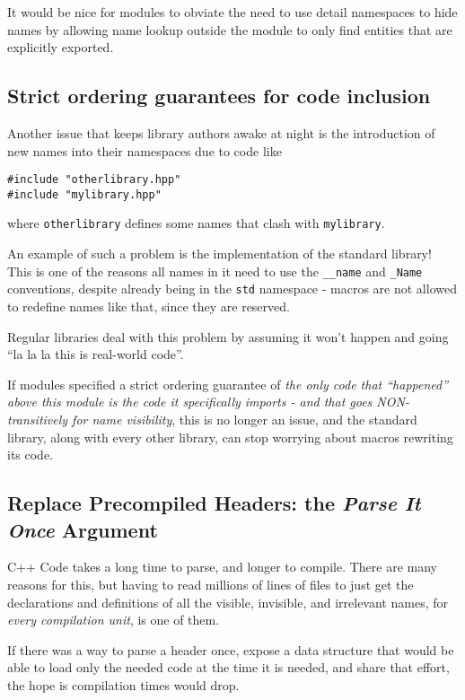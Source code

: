 \documentclass[reqno]{article}
\begin{document}
It would be nice for modules to obviate the need to use detail namespaces to
hide names by allowing name lookup outside the module to only find entities that
are explicitly exported.


\subsection{Strict ordering guarantees for code inclusion}

Another issue that keeps library authors awake at night is the introduction of
new names into their namespaces due to code like

\begin{verbatim}
#include "otherlibrary.hpp"
#include "mylibrary.hpp"
\end{verbatim}

where \texttt{otherlibrary} defines some names that clash with
\texttt{mylibrary}.

An example of such a problem is the implementation of the standard library! This
is one of the reasons all names in it need to use the \texttt{\_\_name} and
\texttt{\_Name} conventions, despite already being in the \texttt{std} namespace
- macros are not allowed to redefine names like that, since they are reserved.

Regular libraries deal with this problem by assuming it won't happen and going
“la la la this is real-world code”.

If modules specified a strict ordering guarantee of \emph{the only code that
“happened” above this module is the code it specifically imports - and that goes
NON-transitively for name visibility}, this is no longer an issue, and the
standard library, along with every other library, can stop worrying about macros
rewriting its code.


\subsection{Replace Precompiled Headers: the \emph{Parse It Once} Argument}

C++ Code takes a long time to parse, and longer to compile. There are many
reasons for this, but having to read millions of lines of files to just get the
declarations and definitions of all the visible, invisible, and irrelevant
names, for \emph{every compilation unit}, is one of them.

If there was a way to parse a header once, expose a data structure that would be
able to load only the needed code at the time it is needed, and share that
effort, the hope is compilation times would drop.
\end{document}
